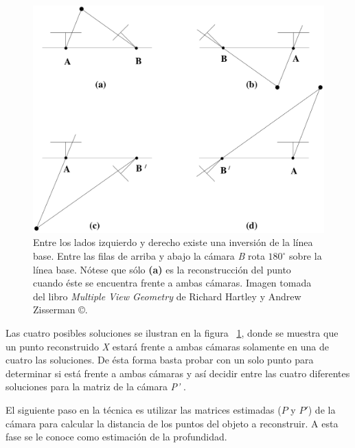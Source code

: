 \begin{figure}[H]
\centering
\includegraphics[width=1.0\textwidth]{images/foursolution1.png}
\caption[Cuatro posibles soluciones para reconstrucci\'{o}n calibrada usando \textit{E}]%
{Entre los lados izquierdo y derecho existe una inversi\'{o}n de la l\'{i}nea base. Entre las filas de arriba y abajo la c\'{a}mara \textit{B} rota $180^\circ$ sobre la l\'{i}nea base. N\'{o}tese que s\'{o}lo \textbf{(a)} es la reconstrucci\'{o}n del punto cuando \'{e}ste se encuentra frente a ambas c\'{a}maras. Imagen tomada del libro \textit{Multiple View Geometry} de Richard Hartley y Andrew Zisserman \copyright.}
\label{fig:FourSolutions1}
\end{figure}

Las cuatro posibles soluciones se ilustran en la figura ~\ref{fig:FourSolutions1}, donde se muestra que un punto reconstruido \textit{X} estar\'{a} frente a ambas c\'{a}maras solamente en una de cuatro las soluciones. De \'{e}sta forma basta probar con un solo punto para determinar si est\'{a} frente a ambas c\'{a}maras y as\'{i} decidir entre las cuatro diferentes soluciones para la matriz de la c\'{a}mara \textit{P'} \cite{Hartley_Zisserman_2003}.

El siguiente paso en la t\'{e}cnica es utilizar las matrices estimadas ($P$ y $P'$) de la c\'{a}mara para calcular la distancia de los puntos del objeto a reconstruir. A esta fase se le conoce como estimaci\'{o}n de la profundidad.

